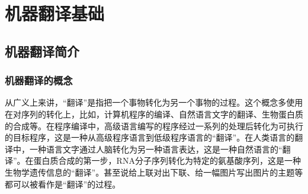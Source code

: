 
%


\part{机器翻译基础}
\renewcommand\figurename{图}%
\renewcommand\tablename{表}%


\chapter{机器翻译简介}


\section{机器翻译的概念}

\parinterval 从广义上来讲，“翻译”是指把一个事物转化为另一个事物的过程。这个概念多使用在对序列的转化上，比如，计算机程序的编译、自然语言文字的翻译、生物蛋白质的合成等。在程序编译中，高级语言编写的程序经过一系列的处理后转化为可执行的目标程序，这是一种从高级程序语言到低级程序语言的“翻译”。在人类语言的翻译中，一种语言文字通过人脑转化为另一种语言表达，这是一种自然语言的“翻译”。在蛋白质合成的第一步，RNA分子序列转化为特定的氨基酸序列，这是一种生物学遗传信息的“翻译”。甚至说给上联对出下联、给一幅图片写出图片的主题等都可以被看作是“翻译”的过程。
\vspace{0.5em}

